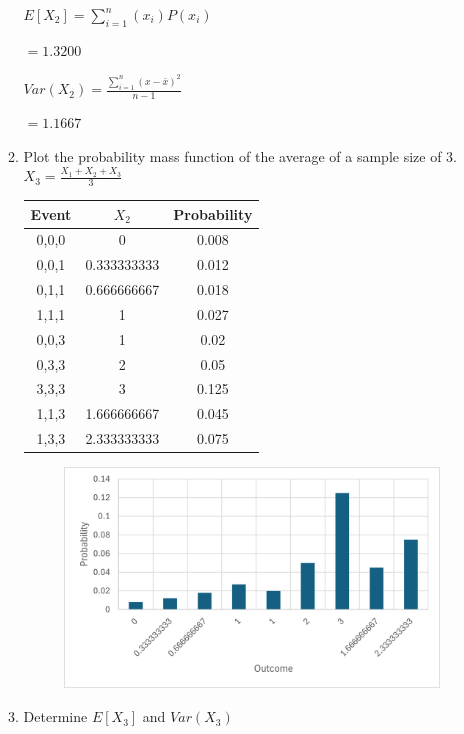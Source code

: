 \documentclass{article}
\begin{document}
\begin{enumerate}
\begin{enumerate}
        $\displaystyle E[X_2] = \sum_{i=1}^n{(x_i)P(x_i)}$

        $= 1.3200$

        $\displaystyle Var(X_2) = \frac{\sum_{i=1}^n{(x - \bar{x})^2}}{n-1}$

        $= 1.1667$

        \item Plot the probability mass function of the average of a sample size of 3. $X_3 = \frac{X_1+X_2+X_3}{3}$
        
        \begin{tabular}{|c|c|c|}
            \hline
            \textbf{Event} & \bf{$X_2$} & \textbf{Probability} \\
            \hline
            0,0,0 & 0 & 0.008 \\
            0,0,1 & 0.333333333 & 0.012 \\
            0,1,1 & 0.666666667 & 0.018 \\
            1,1,1 & 1 & 0.027 \\
            0,0,3 & 1 & 0.02 \\
            0,3,3 & 2 & 0.05 \\
            3,3,3 & 3 & 0.125 \\
            1,1,3 & 1.666666667 & 0.045 \\
            1,3,3 & 2.333333333 & 0.075 \\
            \hline
            \end{tabular}
        
        \begin{figure}[!htbp]
                \centerline{\includegraphics[keepaspectratio]{Picture/Picture2.png}}
                \label{fig1}
            \end{figure}
        \item Determine $E[X_3]$ and $Var(X_3)$
        

\end{enumerate}
\end{enumerate}
\end{document}
